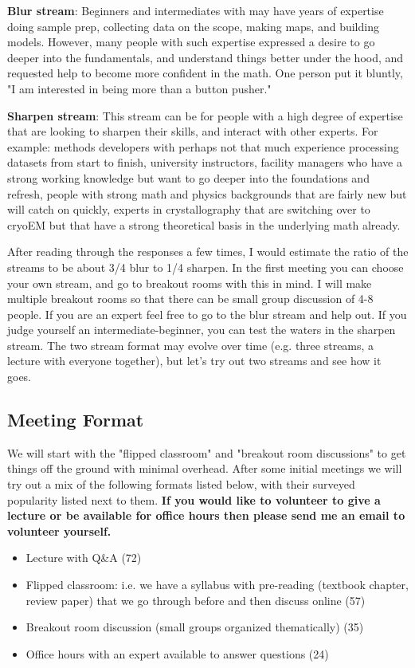 \documentclass[11pt, oneside]{article}   	%
\begin{document}
{\bf  Blur stream}: Beginners and intermediates with may have years of expertise doing sample prep, collecting data on the scope, making maps, and building models. However, many people with such expertise expressed a desire to go deeper into the fundamentals, and understand things better under the hood, and requested help to become more confident in the math. One person put it bluntly, "I am interested in being more than a button pusher."

{\bf Sharpen stream}: This stream can be for people with a high degree of expertise that are looking to sharpen their skills, and interact with other experts. For example: methods developers with perhaps not that much experience processing datasets from start to finish, university instructors, facility managers who have a strong working knowledge but want to go deeper into the foundations and refresh, people with strong math and physics backgrounds that are fairly new but will catch on quickly, experts in crystallography that are switching over to cryoEM but that have a strong theoretical basis in the underlying math already.

After reading through the responses a few times, I would estimate the ratio of the streams to be about 3/4 blur to 1/4 sharpen. In the first meeting you can choose your own stream, and go to breakout rooms with this in mind. I will make multiple breakout rooms so that there can be small group discussion of 4-8 people. If you are an expert feel free to go to the blur stream and help out. If you judge yourself an intermediate-beginner, you can test the waters in the sharpen stream. The two stream format may evolve over time (e.g. three streams, a lecture with everyone together), but let's try out two streams and see how it goes.

\subsection{Meeting Format}
We will start with the "flipped classroom" and "breakout room discussions" to get things off the ground with minimal overhead. After some initial meetings we will try out a mix of the following formats listed below, with their surveyed popularity  listed next to them. {\bf If you would like to volunteer to give a lecture or be available for office hours then please send me an email to volunteer yourself.}
\begin{itemize}
	\item Lecture with Q\&A (72)
	\item Flipped classroom: i.e. we have a syllabus with pre-reading (textbook chapter, review paper) that we go through before and then discuss online (57)
	\item Breakout room discussion (small groups organized thematically) (35)
	\item Office hours with an expert available to answer questions (24)	
\end{itemize}
\end{document}
